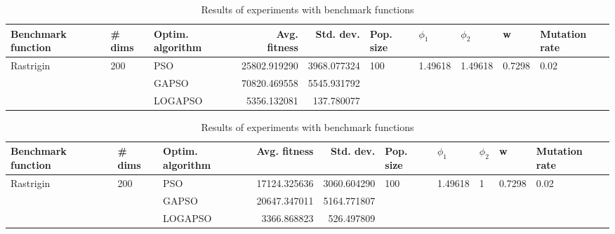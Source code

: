 \documentclass{article}
\begin{document}
\begin{table}
\centering
\caption{Results of experiments with benchmark functions}
\begin{tabular}{lllrrlllll}
\toprule
        Benchmark function &              \# dims & Optim. algorithm &  Avg. fitness &   Std. dev. &            Pop. size &               $\phi_{1}$ &               $\phi_{2}$ &                       w &         Mutation rate \\
\midrule
\multirow{3}{*}{Rastrigin} & \multirow{3}{*}{200} &              PSO &  25802.919290 & 3968.077324 & \multirow{3}{*}{100} & \multirow{3}{*}{1.49618} & \multirow{3}{*}{1.49618} & \multirow{3}{*}{0.7298} & \multirow{3}{*}{0.02} \\
                           &                      &            GAPSO &  70820.469558 & 5545.931792 &                      &                          &                          &                         &                       \\
                           &                      &          LOGAPSO &   5356.132081 &  137.780077 &                      &                          &                          &                         &                       \\
\bottomrule
\end{tabular}
\end{table}
\begin{table}
\centering
\caption{Results of experiments with benchmark functions}
\begin{tabular}{lllrrlllll}
\toprule
        Benchmark function &              \# dims & Optim. algorithm &  Avg. fitness &   Std. dev. &            Pop. size &               $\phi_{1}$ &         $\phi_{2}$ &                       w &         Mutation rate \\
\midrule
\multirow{3}{*}{Rastrigin} & \multirow{3}{*}{200} &              PSO &  17124.325636 & 3060.604290 & \multirow{3}{*}{100} & \multirow{3}{*}{1.49618} & \multirow{3}{*}{1} & \multirow{3}{*}{0.7298} & \multirow{3}{*}{0.02} \\
                           &                      &            GAPSO &  20647.347011 & 5164.771807 &                      &                          &                    &                         &                       \\
                           &                      &          LOGAPSO &   3366.868823 &  526.497809 &                      &                          &                    &                         &                       \\
\bottomrule
\end{tabular}
\end{table}
\end{document}
